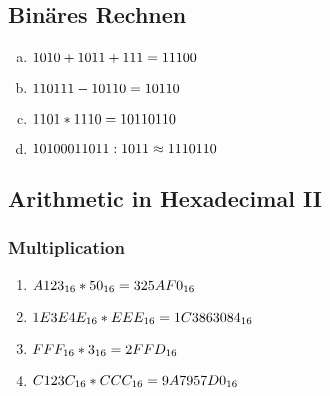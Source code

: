 \documentclass[12pt, a4paper, oneside]{article}
\begin{document}
\subsection{Binäres Rechnen}
\begin{enumerate}[a.)]
  \item $1010 + 1011 +111 \hfill = 11100$
  \item $110111 - 10110 \hfill = 10110$
  \item $1101 * 1110 \hfill = 10110110$
  \item $10100011011 : 1011 \hfill \approx 1110110$
\end{enumerate}

\subsection{Arithmetic in Hexadecimal II}
\subsubsection{Multiplication}
\begin{enumerate}[$\bullet$]
  \item $A123_{16} * 50_{16} \hfill = 325AF0_{16}$
  \item $1E3E4E_{16} * EEE_{16} \hfill = 1C3863084_{16}$
  \item $FFF_{16} * 3_{16} \hfill = 2FFD_{16}$
  \item $C123C_{16} * CCC_{16} \hfill = 9A7957D0_{16}$ 
\end{enumerate}
\end{document}
